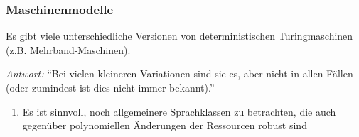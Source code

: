 \documentclass[onlymath]{beamer}
\begin{document}
\begin{frame}\frametitle{Maschinenmodelle}

Es gibt viele unterschiedliche Versionen von deterministischen Turingmaschinen (z.B. Mehrband-Maschinen).\\

\pause

\emph{Antwort:} "`Bei vielen kleineren Variationen sind sie es, aber nicht in allen Fällen (oder zumindest ist dies nicht immer bekannt)."'

\pause

\begin{enumerate}[$\leadsto$]
\item Es ist sinnvoll, \alert{noch allgemeinere Sprachklassen} zu betrachten, die auch gegenüber polynomiellen Änderungen der Ressourcen robust sind
\end{enumerate}

\end{frame}
\end{document}
